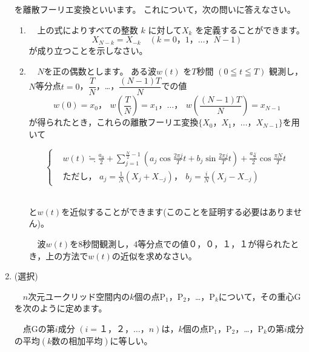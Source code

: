 \documentclass[dvipdfmx, 11pt]{jsarticle}
\newcommand{\PP}[0]{\mathrm{P}}
\renewcommand{\(}[0]{\left(}
\renewcommand{\)}[0]{\right)}
\renewcommand{\[}[0]{\left[}
\renewcommand{\]}[0]{\right]}
\renewcommand{\labelenumii}{(\arabic{enumii})}
\begin{document}
\begin{enumerate}
	を離散フーリエ変換といいます。
	これについて，次の問いに答えなさい。
	\begin{enumerate}
		\item
		 　上の式によりすべての整数 $k$ に対して$X_k$ を定義することができます。
		 \begin{equation*}
		 	X_{N - k} = X_{-k} \quad (k = 0，1，…，N - 1)
		 \end{equation*}
		 が成り立つことを示しなさい。
		 
		 \item
		 　$N$を正の偶数とします。
		 ある波$w(t)$ を$T$秒間 $(0 \leqq t \leqq T)$ 観測し，$N$等分点$t = 0$，$\dfrac{T}{N}$，…，$\dfrac{(N - 1)T}{N}$での値
		 \begin{equation*}
		 	w(0) = x_0，\ \,
		 		w \( \frac{T}{N} \) = x_1，…，\ \,
		 		w \( \frac{(N - 1)T}{N} \) = x_{N - 1}
		 \end{equation*}
		 が得られたとき，これらの離散フーリエ変換$\{ X_0，X_1，…，X_{N - 1} \}$を用いて
		 
		 \begin{equation*}
		 	\left\{
		 	\begin{aligned}
		 		&w(t) \fallingdotseq 
		 			\frac{a_0}{2} 
		 				+ \sum_{j = 1}^{\frac{N}{2} - 1} 
		 					\( a_j \cos\frac{2\pi j}{T}t + b_j \sin \frac{2\pi j}{T}t \)
						+ \frac{a_{\frac{N}{2}}}{2} \cos \frac{\pi N}{T}t\\
				&\mbox{ただし， } a_j = \frac{1}{N} (X_j + X_{-j})，\ \,
					b_j = \frac{i}{N} (X_j - X_{-j})
		 	\end{aligned}
		 	\right.
		 \end{equation*}\ 
		 
		 と$w(t)$を近似することができます(このことを証明する必要はありません)。
		
		 　波$w(t)$を$8$秒間観測し，$4$等分点での値$０，０，１，１$が得られたとき，上の方法で$w(t)$の近似を求めなさい。
		 
	\end{enumerate}
	
	\newpage


	\item \quad (選択)
	
	　$n$次元ユークリッド空間内の$k$個の点$\PP_1$，$\PP_2$，…，$\PP_k$について，その重心Gを次のように定めます。
	
	\begin{screen}
		　点Gの第$i$成分 $(i = １，２，…，n)$は，$k$個の点$\PP_1$，$\PP_2$，…，$\PP_k$の第$i$成分の平均$(k\mbox{数の相加平均})$に等しい。
	\end{screen}


\end{enumerate}
\end{document}
